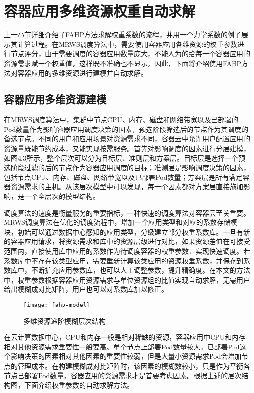 \section{容器应用多维资源权重自动求解}
上一小节详细介绍了FAHP方法求解权重系数的流程，并用一个力学系数的例子展示其计算过程。在MRWS调度算法中，需要使用容器应用各维资源的权重参数进行节点评分，由于需要调度的容器应用数量庞大，不能人为的给每一个容器应用的资源需求赋一个权重值，这样既不准确也不显示。因此，下面将介绍使用FAHP方法对容器应用的多维资源进行建模并自动求解。
\subsection{容器应用多维资源建模}
在MRWS调度算法中，集群中节点CPU、内存、磁盘和网络带宽以及已部署的Pod数量作为影响容器应用调度决策的因素，预选阶段筛选后的节点作为其调度的备选节点。不同的用户和应用场景对资源需求不同，容器云中允许用户配置应用的资源量既能节约成本，又能实现按需服务。首先对影响调度的因素进行分层建模，如图4.3所示，整个层次可以分为目标层、准则层和方案层。目标层是选择一个预选阶段过滤的后的节点作为容器应用调度的目标；准测层是影响调度决策的因素，包括节点CPU、内存、磁盘、网络带宽以及已部署Pod数量；方案层是所有满足容器资源需求的主机。从该层次模型中可以发现，每一个因素都对方案层直接施加影响，是一个全层次的模型结构。

调度算法的速度是衡量服务的重要指标，一种快速的调度算法对容器云至关重要。MRWS调度算法在优化的调度流程中，增加一个应用类型和对应的系数存储模块，初始可以通过数据中心感知的应用类型，分级建立部分权重系数库。一旦有新的容器应用请求，将资源需求和库中的资源层级进行对比，如果资源差值在可接受范围内，直接使用库中应用的系数作为待调度容器的权重参数，实现快速调度。若系数库中不存在该类型应用，需要重新计算该类应用的资源权重系数，并保存到系数库中，不断扩充应用参数库，也可以人工调整参数，提升精确度。在本文的方法中，权重参数根据容器应用资源需求与单位资源组的比值实现自动求解，无需用户给出模糊成对比矩阵，用户也可以对系数库加以修正。
\begin{figure}[H] %
	\centering
	\texttt{[image: fahp-model]}
	\caption{多维资源递阶模糊层次结构}
\end{figure}
在云计算数据中心，CPU和内存一般是相对稀缺的资源，容器应用中CPU和内存相对其他资源需求重要性一般要高。单个节点上部署Pod数量较大，已部署Pod这个影响决策的因素相对其他因素的重要性较弱，但是大量小资源需求Pod会增加节点的管理成本。在构建模糊成对比矩阵时，该因素的模糊数较小，只是作为平衡各节点已部署Pod数量，容器应用的资源需求才是首要考虑因素。根据上述的层次结构图，下面介绍权重参数的自动求解方法。

